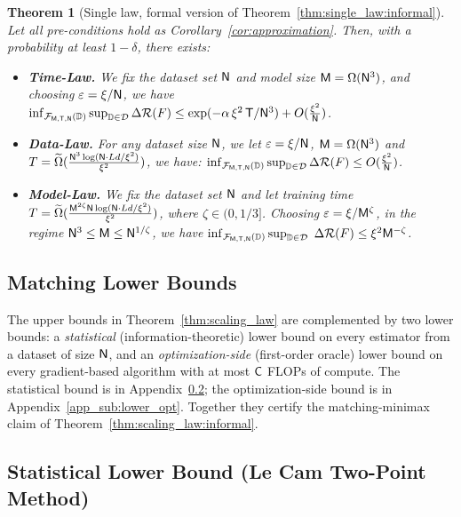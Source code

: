 \documentclass[11pt]{article}
\theoremstyle{plain}
\newtheorem{theorem}{Theorem}[section]
\newcommand{\wt}{\widetilde}
\begin{document}
\begin{theorem}[Single law, formal version of Theorem~\ref{thm:single_law:informal}]\label{thm:single_law}
    Let all pre-conditions hold as Corollary~\ref{cor:approximation}. Then, with a probability at least $1 - \delta$, there exists:
    \begin{itemize}
        \item {\bf Time-Law.} We fix the dataset set ${\sf N}$ and model size ${\sf M} = \Omega({\sf N}^3)$, and choosing $\varepsilon = \xi/{\sf N}$, we have $\inf_{{\cal F}_{\sf M, T, N}(\mathbb{D})} \sup_{\mathbb{D} \in {\cal D}}  \Delta{\cal R}(F)  \leq \exp(-\alpha\,\xi^2\,{\sf T}/{\sf N}^3) +  O(\frac{\xi^2}{{\sf N}} )$.
        \item {\bf Data-Law.} For any dataset size ${\sf N}$, we let $\varepsilon = \xi/{\sf N}$, ${\sf M} = \Omega({\sf N}^3)$ and $T = \wt{\Omega}(\frac{{\sf N}^3\log({\sf N}\cdot Ld/\xi^2)}{\xi^2})$, we have: $\inf_{{\cal F}_{\sf M, T, N}(\mathbb{D})} \sup_{\mathbb{D} \in {\cal D}}  \Delta{\cal R}(F)  \leq   O(\frac{\xi^2}{{\sf N}} )$.
        \item {\bf Model-Law.} We fix the dataset set ${\sf N}$ and let training time $T = \wt{\Omega}(\frac{{\sf M}^{2\zeta}\mathsf{N}\log({\sf N}\cdot Ld/\xi^2)}{\xi^2})$, where $\zeta \in (0, 1/3]$. Choosing $\varepsilon = \xi/{\sf M}^{\zeta}$, in the regime ${\sf N}^3 \le {\sf M} \le {\sf N}^{1/\zeta}$, we have $\inf_{{\cal F}_{\sf M, T, N}(\mathbb{D})} \sup_{\mathbb{D} \in {\cal D}} $ $ \Delta{\cal R}(F)  \leq \xi^2 {\sf M}^{-\zeta}$.
    \end{itemize}
\end{theorem}

\subsection{Matching Lower Bounds}\label{app_sub:lower_bounds}

The upper bounds in Theorem~\ref{thm:scaling_law} are complemented by two lower bounds: a {\it statistical} (information-theoretic) lower bound on every estimator from a dataset of size ${\sf N}$, and an {\it optimization-side} (first-order oracle) lower bound on every gradient-based algorithm with at most ${\sf C}$ FLOPs of compute. The statistical bound is in Appendix~\ref{app_sub:lower_stat}; the optimization-side bound is in Appendix~\ref{app_sub:lower_opt}. Together they certify the matching-minimax claim of Theorem~\ref{thm:scaling_law:informal}.

\subsection{Statistical Lower Bound (Le Cam Two-Point Method)}\label{app_sub:lower_stat}
\end{document}

